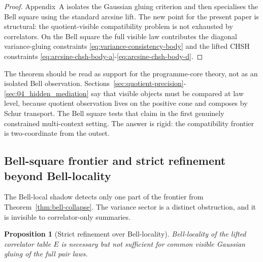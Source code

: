 \documentclass[11pt]{article}
\numberwithin{equation}{section}
\theoremstyle{thmcompact}
\newtheorem{proposition}[theorem]{Proposition}
\theoremstyle{remark}
\begin{document}
\begin{proof}
Appendix~A isolates the Gaussian gluing criterion and then specialises the Bell square using the standard arcsine lift. The new point for the present paper is structural: the quotient-visible compatibility problem is not exhausted by correlators. On the Bell square the full visible law contributes the diagonal variance-gluing constraints \eqref{eq:variance-consistency-body} and the lifted CHSH constraints \eqref{eq:arcsine-chsh-body-a}-\eqref{eq:arcsine-chsh-body-d}.
\end{proof}

The theorem should be read as support for the programme-core theory, not as an isolated Bell observation. Sections~\ref{sec:quotient-precision}-\ref{sec:04_hidden_mediation} say that visible objects must be compared at law level, because quotient observation lives on the positive cone and composes by Schur transport. The Bell square tests that claim in the first genuinely constrained multi-context setting. The answer is rigid: the compatibility frontier is two-coordinate from the outset.

\subsection{Bell-square frontier and strict refinement beyond Bell-locality}

The Bell-local shadow detects only one part of the frontier from Theorem~\ref{thm:bell-collapse}. The variance sector is a distinct obstruction, and it is invisible to correlator-only summaries.

\begin{proposition}[Strict refinement over Bell-locality]\label{prop:bell-strict-refinement}
Bell-locality of the lifted correlator table $E$ is necessary but not sufficient for common visible Gaussian gluing of the full pair laws.
\end{proposition}
\end{document}

